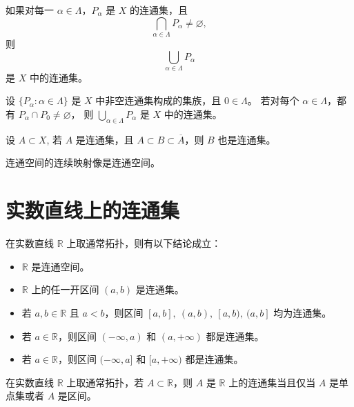 \begin{theorem}
如果对每一 $\alpha\in\Lambda$，$P_\alpha$ 是 $X$ 的连通集，且 
\[
\bigcap_{\alpha\in\Lambda} P_\alpha \neq \varnothing,
\]
则 
\[
\bigcup_{\alpha\in\Lambda} P_\alpha
\]
是 $X$ 中的连通集。
\end{theorem}
\begin{theorem}[所有与某个公共连通集相交的一族连通集的并仍然是连通的]
设 $\{P_\alpha : \alpha \in \Lambda\}$ 是 $X$ 中非空连通集构成的集族，且 $0 \in \Lambda$。  
若对每个 $\alpha \in \Lambda$，都有 $P_\alpha \cap P_0 \neq \varnothing$，  
则 $\bigcup_{\alpha \in \Lambda} P_\alpha$ 是 $X$ 中的连通集。
\end{theorem}
\begin{theorem}[连通集和他的闭包之间的集合都是连通的]
设 $A \subset X$, 若 $A$ 是连通集，且 $A \subset B \subset \overline{A}$，则 $B$ 也是连通集。
\end{theorem}
\begin{theorem}[连通空间+连续映射=连通]
连通空间的连续映射像是连通空间。
\end{theorem}
\section{实数直线上的连通集}
\begin{proposition}[通常拓扑的结论]
在实数直线 $\mathbb{R}$ 上取通常拓扑，则有以下结论成立：
\begin{itemize}
    \item[(1)] $\mathbb{R}$ 是连通空间。
    \item[(2)] $\mathbb{R}$ 上的任一开区间 $(a,b)$ 是连通集。
    \item[(3)] 若 $a,b\in\mathbb{R}$ 且 $a<b$，则区间 $[a,b],\ (a,b),\ [a,b),\ (a,b]$ 均为连通集。
    \item[(4)] 若 $a\in\mathbb{R}$，则区间 $(-\infty,a)$ 和 $(a,+\infty)$ 都是连通集。
    \item[(5)] 若 $a\in\mathbb{R}$，则区间 $(-\infty,a]$ 和 $[a,+\infty)$ 都是连通集。
\end{itemize}
\end{proposition}
\begin{theorem}[实数直线上连通集]
在实数直线 $\mathbb{R}$ 上取通常拓扑，若 $A\subset \mathbb{R}$，则 $A$ 是 $\mathbb{R}$ 上的连通集当且仅当 $A$ 是单点集或者 $A$ 是区间。
\end{theorem}
